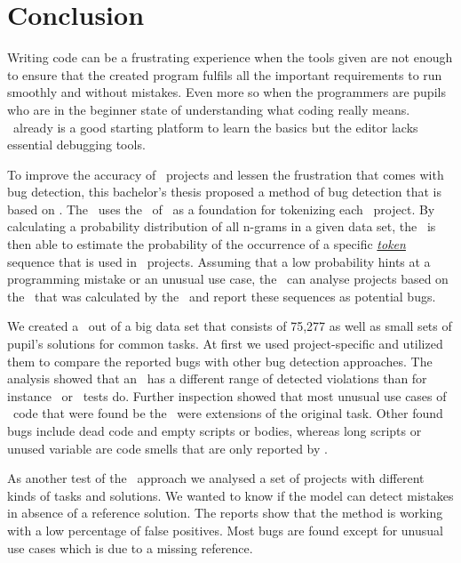\chapter{Conclusion}\label{chap:conclusion}

Writing code can be a frustrating experience when the tools given are not enough to ensure that the created program fulfils all the important requirements to run smoothly and without mistakes. Even more so when the programmers are pupils who are in the beginner state of understanding what coding really means. \scratch\ already is a good starting platform to learn the basics but the editor lacks essential debugging tools.

To improve the accuracy of \scratch\ projects and lessen the frustration that comes with bug detection, this bachelor's thesis proposed a method of bug detection that is based on . The \tokenizer\ uses the \AST\ of \litterbox\ as a foundation for tokenizing each \scratch\ project. By calculating a probability distribution of all n-grams in a given data set, the \ngramtrainer\ is then able to estimate the probability of the occurrence of a specific \hyperref[def:token]{\textit{token}} sequence that is used in \scratch\ projects. Assuming that a low probability hints at a programming mistake or an unusual use case, the \ngrambugfinder\ can analyse projects based on the \ngram\ that was calculated by the \ngramtrainer\ and report these sequences as potential bugs.

We created a \ngram\ out of a big data set that consists of 75,277 as well as small sets of pupil's solutions for common tasks. At first we used project-specific  and utilized them to compare the reported bugs with other bug detection approaches. The analysis showed that an \ngram\ has a different range of detected violations than for instance \litterbox\ or \whisker\ tests do. Further inspection showed that most unusual use cases of \scratch\ code that were found be the \ngram\ were extensions of the original task. Other found bugs include dead code and empty scripts or bodies, whereas long scripts or unused variable are code smells that are only reported by \litterbox{}. 

As another test of the \ngram\ approach we analysed a set of projects with different kinds of tasks and solutions. We wanted to know if the model can detect mistakes in absence of a reference solution. The reports show that the method is working with a low percentage of false positives. Most bugs are found except for unusual use cases which is due to a missing reference.

